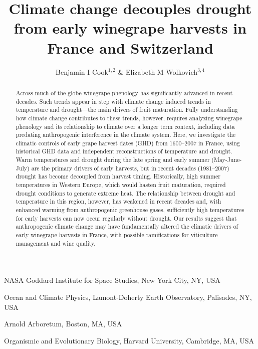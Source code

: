 \documentclass[final]{nature}
\title{Climate change decouples drought from early winegrape harvests in France and Switzerland} %
\author{Benjamin I Cook$^{1,2}$ \& Elizabeth M Wolkovich$^{3,4}$}
\begin{document}
\maketitle

\begin{affiliations}
 \item NASA Goddard Institute for Space Studies, New York City, NY, USA
 \item Ocean and Climate Physics, Lamont-Doherty Earth Observatory, Palisades, NY, USA
 \item Arnold Arboretum, Boston, MA, USA
 \item Organismic and Evolutionary Biology, Harvard University, Cambridge, MA, USA
\end{affiliations}

\begin{abstract}
Across much of the globe winegrape phenology has significantly advanced in recent decades\cite{Duchene:2005bd,Seguin2005,webb2011}. Such trends appear in step with climate change induced trends in temperature and drought---the main drivers of fruit maturation. Fully understanding how climate change contributes to these trends, however, requires analyzing winegrape phenology and its relationship to climate over a longer term context, including data predating anthropogenic interference in the climate system. Here, we investigate the climatic controls of early grape harvest dates (GHD) from 1600--2007 in France, using historical GHD data\cite{Daux2012} and independent reconstructions of temperature\cite{Luterbacher2004} and drought\cite{CookOWDA2015,Pauling2006}. Warm temperatures and drought during the late spring and early summer (May-June-July) are the primary drivers of early harvests, but in recent decades (1981--2007) drought has become decoupled from harvest timing. Historically, high summer temperatures in Western Europe, which would hasten fruit maturation, required drought conditions to generate extreme heat. The relationship between drought and temperature in this region, however, has weakened in recent decades and, with enhanced warming from anthropogenic greenhouse gases, sufficiently high temperatures for early harvests can now occur regularly without drought. Our results suggest that anthropogenic climate change may have fundamentally altered the climatic drivers of early winegrape harvests in France, with possible ramifications for viticulture management and wine quality. 
\end{abstract}
\end{document}
